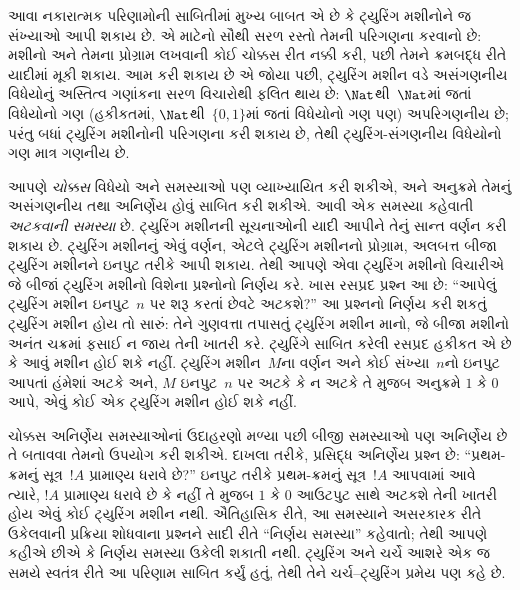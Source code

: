 આવા નકારાત્મક પરિણામોની સાબિતીમાં મુખ્ય બાબત એ છે કે
ટ્યુરિંગ મશીનોને જ સંખ્યાઓ આપી શકાય છે. એ માટેનો સૌથી
સરળ રસ્તો તેમની પરિગણના કરવાનો છે: મશીનો અને તેમના
પ્રોગ્રામ લખવાની કોઈ ચોક્કસ રીત નક્કી કરી, પછી તેમને
ક્રમબદ્ધ રીતે યાદીમાં મૂકી શકાય. આમ કરી શકાય છે એ
જોયા પછી, ટ્યુરિંગ મશીન વડે અસંગણનીય વિધેયોનું અસ્તિત્વ
ગણાંકના સરળ વિચારોથી ફલિત થાય છે: $\Nat$થી~$\Nat$માં
જતાં વિધેયોનો ગણ (હકીકતમાં, $\Nat$થી~$\{0, 1\}$માં
જતાં વિધેયોનો ગણ પણ) અપરિગણનીય છે; પરંતુ બધાં
ટ્યુરિંગ મશીનોની પરિગણના કરી શકાય છે, તેથી ટ્યુરિંગ-સંગણનીય
વિધેયોનો ગણ માત્ર ગણનીય છે.

આપણે \emph{ચોક્કસ} વિધેયો અને સમસ્યાઓ પણ વ્યાખ્યાયિત
કરી શકીએ, અને અનુક્રમે તેમનું અસંગણનીય તથા અનિર્ણેય
હોવું સાબિત કરી શકીએ. આવી એક સમસ્યા કહેવાતી
\emph{અટકવાની સમસ્યા} છે. ટ્યુરિંગ મશીનની સૂચનાઓની
યાદી આપીને તેનું સાન્ત વર્ણન કરી શકાય છે. ટ્યુરિંગ
મશીનનું એવું વર્ણન, એટલે ટ્યુરિંગ મશીનનો પ્રોગ્રામ,
અલબત્ત બીજા ટ્યુરિંગ મશીનને ઇનપુટ તરીકે આપી શકાય.
તેથી આપણે એવા ટ્યુરિંગ મશીનો વિચારીએ જે બીજાં
ટ્યુરિંગ મશીનો વિશેના પ્રશ્નોનો નિર્ણય કરે. ખાસ
રસપ્રદ પ્રશ્ન આ છે: ``આપેલું ટ્યુરિંગ મશીન ઇનપુટ~$n$
પર શરૂ કરતાં છેવટે અટકશે?'' આ પ્રશ્નનો નિર્ણય
કરી શકતું ટ્યુરિંગ મશીન હોય તો સારું: તેને ગુણવત્તા
તપાસતું ટ્યુરિંગ મશીન માનો, જે બીજા મશીનો અનંત
ચક્રમાં ફસાઈ ન જાય તેની ખાતરી કરે. ટ્યુરિંગે સાબિત
કરેલી રસપ્રદ હકીકત એ છે કે આવું મશીન હોઈ શકે નહીં.
ટ્યુરિંગ મશીન~$M$ના વર્ણન અને કોઈ સંખ્યા~$n$નો
ઇનપુટ આપતાં હંમેશાં અટકે અને, $M$ ઇનપુટ~$n$ પર
અટકે કે ન અટકે તે મુજબ અનુક્રમે $1$ કે $0$ આપે,
એવું કોઈ એક ટ્યુરિંગ મશીન હોઈ શકે નહીં.

ચોક્કસ અનિર્ણેય સમસ્યાઓનાં ઉદાહરણો મળ્યા પછી બીજી
સમસ્યાઓ પણ અનિર્ણેય છે તે બતાવવા તેમનો ઉપયોગ
કરી શકીએ. દાખલા તરીકે, પ્રસિદ્ધ અનિર્ણેય પ્રશ્ન છે:
``પ્રથમ-ક્રમનું સૂત્ર~$!A$ પ્રામાણ્ય ધરાવે છે?''
ઇનપુટ તરીકે પ્રથમ-ક્રમનું સૂત્ર~$!A$ આપવામાં આવે
ત્યારે, $!A$ પ્રામાણ્ય ધરાવે છે કે નહીં તે મુજબ $1$ કે
$0$ આઉટપુટ સાથે અટકશે તેની ખાતરી હોય એવું કોઈ ટ્યુરિંગ
મશીન નથી. ઐતિહાસિક રીતે, આ સમસ્યાને અસરકારક રીતે
ઉકેલવાની પ્રક્રિયા શોધવાના પ્રશ્નને સાદી રીતે ``નિર્ણય
સમસ્યા'' કહેવાતો; તેથી આપણે કહીએ છીએ કે નિર્ણય સમસ્યા
ઉકેલી શકાતી નથી. ટ્યુરિંગ અને ચર્ચે આશરે એક જ સમયે સ્વતંત્ર
રીતે આ પરિણામ સાબિત કર્યું હતું, તેથી તેને ચર્ચ--ટ્યુરિંગ
પ્રમેય પણ કહે છે.
\endgroup


\begingroup
\makeatletter{}\makeatother

\label{guunit:OLP-0266}


